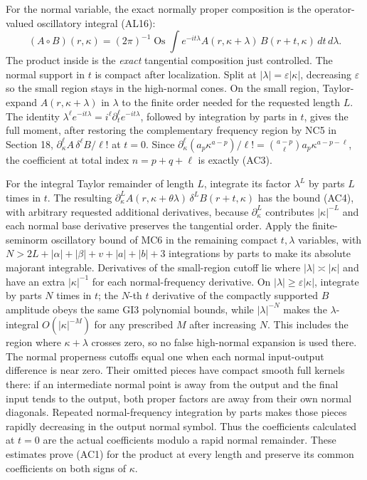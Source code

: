 \documentclass[
  11pt,
]{article}
\begin{document}
For the normal variable, the exact normally proper composition is the
operator-valued oscillatory integral (AL16): \[
 (A\circ B)(r,\kappa)=(2\pi)^{-1}\operatorname{Os}
 \int e^{-it\lambda}A(r,\kappa+\lambda)\,B(r+t,\kappa)\,dt\,d\lambda .
 \tag{AC5}
\] The product inside is the \emph{exact} tangential composition just
controlled. The normal support in \(t\) is compact after localization.
Split at \(|\lambda|=\varepsilon|\kappa|\), decreasing \(\varepsilon\)
so the small region stays in the high-normal cones. On the small region,
Taylor-expand \(A(r,\kappa+\lambda)\) in \(\lambda\) to the finite order
needed for the requested length \(L\). The identity
\(\lambda^\ell e^{-it\lambda}=i^\ell\partial_t^\ell e^{-it\lambda}\),
followed by integration by parts in \(t\), gives the full moment, after
restoring the complementary frequency region by NC5 in Section 18,
\(\partial_\kappa^\ell A\,\delta^\ell B/\ell!\) at \(t=0\). Since
\(\partial_\kappa^\ell(a_p\kappa^{a-p})/\ell!=\binom{a-p}{\ell}a_p\kappa^{a-p-\ell}\),
the coefficient at total index \(n=p+q+\ell\) is exactly (AC3).

For the integral Taylor remainder of length \(L\), integrate its factor
\(\lambda^L\) by parts \(L\) times in \(t\). The resulting
\(\partial_\kappa^L A(r,\kappa+\theta\lambda)\,\delta^L B(r+t,\kappa)\)
has the bound (AC4), with arbitrary requested additional derivatives,
because \(\partial_\kappa^L\) contributes \(|\kappa|^{-L}\) and each
normal base derivative preserves the tangential order. Apply the
finite-seminorm oscillatory bound of MC6 in the remaining compact
\(t,\lambda\) variables, with \(N>2L+|\alpha|+|\beta|+v+|a|+|b|+3\)
integrations by parts to make its absolute majorant integrable.
Derivatives of the small-region cutoff lie where
\(|\lambda|\asymp|\kappa|\) and have an extra \(|\kappa|^{-1}\) for each
normal-frequency derivative. On \(|\lambda|\geq\varepsilon|\kappa|\),
integrate by parts \(N\) times in \(t\); the \(N\)-th \(t\) derivative
of the compactly supported \(B\) amplitude obeys the same GI3 polynomial
bounds, while \(|\lambda|^{-N}\) makes the \(\lambda\)-integral
\(O(|\kappa|^{-M})\) for any prescribed \(M\) after increasing \(N\).
This includes the region where \(\kappa+\lambda\) crosses zero, so no
false high-normal expansion is used there. The normal properness cutoffs
equal one when each normal input-output difference is near zero. Their
omitted pieces have compact smooth full kernels there: if an
intermediate normal point is away from the output and the final input
tends to the output, both proper factors are away from their own normal
diagonals. Repeated normal-frequency integration by parts makes those
pieces rapidly decreasing in the output normal symbol. Thus the
coefficients calculated at \(t=0\) are the actual coefficients modulo a
rapid normal remainder. These estimates prove (AC1) for the product at
every length and preserve its common coefficients on both signs of
\(\kappa\).
\end{document}
